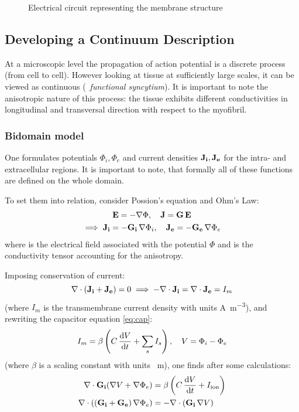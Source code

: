\begin{figure}[h!]
    \centering
    
    \caption{Electrical circuit representing the membrane structure}
    \label{fig:circut}
\end{figure}


\subsection{Developing a Continuum Description}
\label{sec:contdescr}
At a microscopic level the propagation of action potential is a discrete
process (from cell to cell). However looking at tissue at sufficiently large
scales, it can be viewed as continuous (\textrightarrow~\emph{functional
syncytium}). It is important to note the anisotropic nature of this process:
the tissue exhibits different conductivities in longitudinal and transversal
direction with respect to the myofibril.

\subsubsection{Bidomain model}
One formulates potentials $\Phi_i, \Phi_e$ and current densities $\mathbf{J_i},
\mathbf{J_e}$ for the intra- and extracellular regions.  It is important to
note, that formally all of these functions are defined on the whole domain.

To set them into relation, consider Possion's equation and Ohm's Law:
\begin{gather*}
    \mathbf{E}=-\nabla\Phi,\quad \mathbf{J}=\mathbf{G}\,\mathbf{E} \\
    \implies \mathbf{J_i}=-\mathbf{G_i}\,\nabla\Phi_i,\quad
    \mathbf{J_e}=-\mathbf{G_e}\,\nabla\Phi_e
\end{gather*}
where  is the electrical field associated with the potential $\Phi$
and  is the conductivity tensor accounting for the anisotropy.

Imposing conservation of current:
\begin{equation*}
    \nabla\cdot(\mathbf{J_i}+\mathbf{J_e})=0 \implies
    -\nabla\cdot\mathbf{J_i}=\nabla\cdot\mathbf{J_e}=I_m
\end{equation*}
(where $I_m$ is the transmembrane current density with units
\si{\ampere\per\metre\cubed}), and rewriting the capacitor equation
\eqref{eq:cap}:
\begin{equation*}
    I_m=\beta\left(C\,\dv{V}{t}+\sum_{s}I_{s}\right),\quad V=\Phi_i-\Phi_e
\end{equation*}
(where $\beta$ is a scaling constant with units \si{\per\metre}), one finds
after some calculations:
\begin{subequations}
\begin{align}
    \nabla\cdot\mathbf{G_i}(\nabla{V}+\nabla\Phi_e)
    &=\beta\left(C\,\dv{V}{t}+I_{\mathrm{ion}}\right)
    \label{eq:i}
    \\
    \nabla\cdot\left((\mathbf{G_i}+\mathbf{G_e})\,\nabla\Phi_e\right)
    &=-\nabla\cdot(\mathbf{G_i}\,\nabla{V})
    \label{eq:ii}
\end{align}
\end{subequations}

